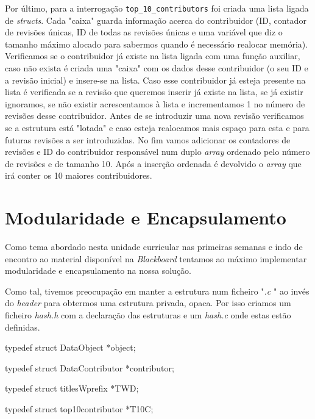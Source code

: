 \documentclass[a4paper,12pt]{report}
\begin{document}
Por último, para a interrogação {\tt top\_10\_contributors} foi criada uma lista ligada de {\sl structs}. Cada "caixa" guarda informação acerca do contribuidor (ID, contador de revisões únicas, ID de todas as revisões únicas e uma variável que diz o tamanho máximo alocado para sabermos quando é necessário realocar memória). Verificamos se o contribuidor já existe na lista ligada com uma função auxiliar, caso não exista é criada uma "caixa" com os dados desse contribuidor (o seu ID e a revisão inicial) e insere-se na lista. Caso esse contribuidor já esteja presente na lista é verificada se a revisão que queremos inserir já existe na lista, se já existir ignoramos, se não existir acrescentamos à lista e incrementamos 1 no número de revisões desse contribuidor. Antes de se introduzir uma nova revisão verificamos se a estrutura está "lotada" e caso esteja realocamos mais espaço para esta e para futuras revisões a ser introduzidas. No fim vamos adicionar os contadores de revisões e ID do contribuidor responsável num duplo {\sl array} ordenado pelo número de revisões e de tamanho 10. Após a inserção ordenada é devolvido o {\sl array} que irá conter os 10 maiores contribuidores.

\section{Modularidade e Encapsulamento}

Como tema abordado nesta unidade curricular	nas primeiras semanas e indo de encontro ao material disponível na {\sl Blackboard} tentamos ao máximo implementar modularidade e encapsulamento na nossa solução.

Como tal, tivemos preocupação em manter a estrutura num ficheiro {"\sl.c }" ao invés do {\sl header} para obtermos uma estrutura privada, opaca. Por isso criamos um ficheiro {\sl hash.h} com a declaração das estruturas e um {\sl hash.c} onde estas estão definidas.

\begin{tcolorbox}[width=\textwidth,colback={darkgray},title={\sf Excerto 3.6: hash.h},outer arc=2mm,colupper=white]    
	{\footnotesize\ttfamily 
		
		{\color{newpink}typedef struct} DataObject {\color{newpink}*}object;
		
		{\color{newpink}typedef struct} DataContributor {\color{newpink}*}contributor;

		{\color{newpink}typedef struct} titlesWprefix {\color{newpink}*}TWD;
		
		{\color{newpink}typedef struct} top10contributor {\color{newpink}*}T10C;
		
	}
\end{tcolorbox} 
\end{document}
